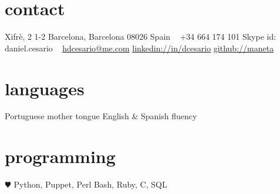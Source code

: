 \documentclass[]{friggeri-cv} %
\begin{document}


\begin{aside} %
\section{contact}
Xifrè, 2 1-2
Barcelona, Barcelona 08026
Spain
~
+34 664 174 101
Skype id: daniel.cesario
~
\href{mailto:hdcesario@me.com}{hdcesario@me.com}
\href{http://es.linkedin.com/in/dcesario/}{linkedin://in/dcesario}
\href{https://github.com/maneta}{github://maneta}
\section{languages}
Portuguese mother tongue
English \& Spanish fluency
\section{programming}
{\color{red} $\varheartsuit$} Python, Puppet, Perl 
Bash, Ruby, C, SQL 
\end{aside}

\end{document}
